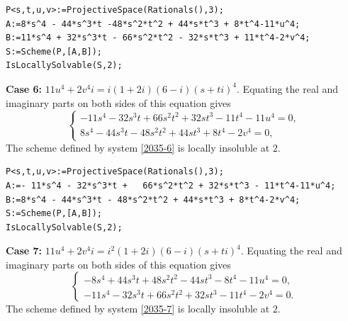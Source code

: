 \documentclass[a4paper,12pt,english,reqno]{amsart}
\begin{document}
\begin{lstlisting}
P<s,t,u,v>:=ProjectiveSpace(Rationals(),3);
A:=8*s^4 - 44*s^3*t -48*s^2*t^2 + 44*s*t^3 + 8*t^4-11*u^4;
B:=11*s^4 + 32*s^3*t - 66*s^2*t^2 - 32*s*t^3 + 11*t^4-2*v^4;
S:=Scheme(P,[A,B]);
IsLocallySolvable(S,2);
\end{lstlisting}
{\bf Case 6:} $11u^4+2v^4i=i(1+2i)(6-i)(s+ti)^4$. Equating the real and imaginary parts on both sides of this equation gives
\begin{equation}\label{2035-6}
\begin{cases}
-11s^4 - 32s^3t + 66s^2t^2 + 32st^3 - 11t^4 - 11u^4=0,\\
8s^4 - 44s^3t - 48s^2t^2 + 44st^3 + 8t^4 - 2v^4=0,
\end{cases}
\end{equation}
The scheme defined by system \eqref{2035-6} is locally insoluble at $2$.

\begin{lstlisting}
P<s,t,u,v>:=ProjectiveSpace(Rationals(),3);
A:=- 11*s^4 - 32*s^3*t +   66*s^2*t^2 + 32*s*t^3 - 11*t^4-11*u^4;
B:=8*s^4 - 44*s^3*t - 48*s^2*t^2 + 44*s*t^3 + 8*t^4-2*v^4;
S:=Scheme(P,[A,B]);
IsLocallySolvable(S,2);
\end{lstlisting}

{\bf Case 7:} $11u^4+2v^4i=i^2(1+2i)(6-i)(s+ti)^4$. Equating the real and imaginary parts on both sides of this equation gives
\begin{equation}\label{2035-7}
\begin{cases}
-8s^4 + 44s^3t + 48s^2t^2 - 44st^3 - 8t^4 - 11u^4=0,\\
-11s^4 - 32s^3t + 66s^2t^2 + 32st^3 - 11t^4 - 2v^4=0.
\end{cases}
\end{equation}
The scheme defined by system \eqref{2035-7} is locally insoluble at $2$.

\end{document}
